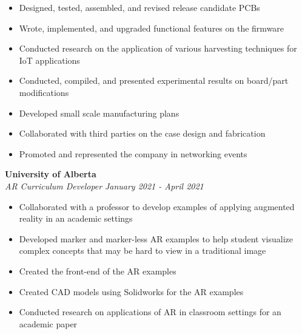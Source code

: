 \documentclass[a4paper,20pt]{article}
\begin{document}
    \begin{itemize}
        \item Designed, tested, assembled, and revised release candidate PCBs \vspace{-5pt}
        \item  Wrote, implemented, and upgraded functional features on the firmware\vspace{-5pt}
        \item Conducted research on the application of various harvesting techniques for IoT applications \vspace{-5pt}
        \item Conducted, compiled, and presented experimental results on board/part modifications  \vspace{-5pt}
        \item Developed small scale manufacturing plans \vspace{-5pt}
        \item Collaborated with third parties on the case design and fabrication \vspace{-5pt}
        \item Promoted and represented the company in networking events 
    \end{itemize}
    \vspace{-1pt}
        \textbf{University of Alberta}\hspace{3cm}
        \textit{}\\
        \textit{AR Curriculum Developer}\hspace{10 cm}
        \textit{January 2021 - April 2021} \\
        \vspace{-18pt} 
        \hspace{-3pt}
        \begin{itemize}
            \item Collaborated with a professor to develop examples of applying augmented reality in an academic settings \vspace{-5pt}
            \item Developed marker and marker-less AR examples to help student visualize complex concepts that may be hard to view in a traditional image \vspace{-5pt}
            \item Created the front-end of the AR examples \vspace{-5pt}
            \item Created CAD models using Solidworks for the AR examples  \vspace{-5pt}
            \item Conducted research on applications of AR in classroom settings for an academic paper
        \end{itemize}        
\end{document}
